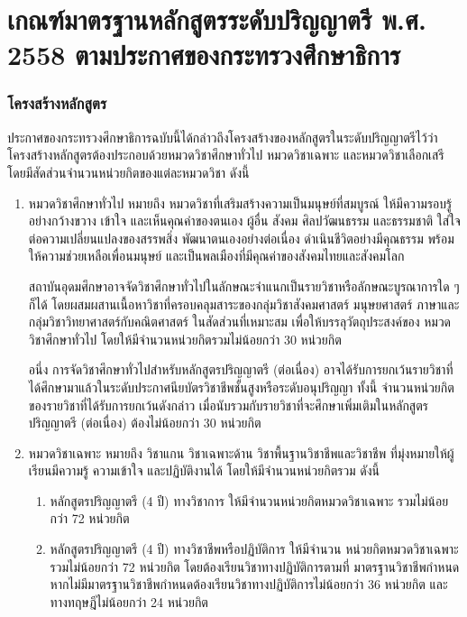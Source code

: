 \section{เกณฑ์มาตรฐานหลักสูตรระดับปริญญาตรี พ.ศ. 2558 ตามประกาศของกระทรวงศึกษาธิการ}

\subsubsection{โครงสร้างหลักสูตร}

ประกาศของกระทรวงศึกษาธิการฉบับนี้ได้กล่าวถึงโครงสร้างของหลักสูตรในระดับปริญญาตรีไว้ว่า โครงสร้างหลักสูตรต้องประกอบด้วยหมวดวิชาศึกษาทั่วไป หมวดวิชาเฉพาะ และหมวดวิชาเลือกเสรี โดยมีสัดส่วนจํานวนหน่วยกิตของแต่ละหมวดวิชา ดังนี้
\begin{enumerate}
    \item หมวดวิชาศึกษาทั่วไป หมายถึง หมวดวิชาที่เสริมสร้างความเป็นมนุษย์ที่สมบูรณ์ ให้มีความรอบรู้อย่างกว้างขวาง เข้าใจ และเห็นคุณค่าของตนเอง ผู้อื่น สังคม ศิลปวัฒนธรรม และธรรมชาติ ใส่ใจต่อความเปลี่ยนแปลงของสรรพสิ่ง พัฒนาตนเองอย่างต่อเนื่อง ดําเนินชีวิตอย่างมีคุณธรรม พร้อมให้ความช่วยเหลือเพื่อนมนุษย์ และเป็นพลเมืองที่มีคุณค่าของสังคมไทยและสังคมโลก 
    
    สถาบันอุดมศึกษาอาจจัดวิชาศึกษาทั่วไปในลักษณะจําแนกเป็นรายวิชาหรือลักษณะบูรณาการใด ๆ ก็ได้ โดยผสมผสานเนื้อหาวิชาที่ครอบคลุมสาระของกลุ่มวิชาสังคมศาสตร์ มนุษยศาสตร์ ภาษาและกลุ่มวิชาวิทยาศาสตร์กับคณิตศาสตร์ ในสัดส่วนที่เหมาะสม เพื่อให้บรรลุวัตถุประสงค์ของ หมวดวิชาศึกษาทั่วไป โดยให้มีจํานวนหน่วยกิตรวมไม่น้อยกว่า 30 หน่วยกิต

    อนึ่ง การจัดวิชาศึกษาทั่วไปสําหรับหลักสูตรปริญญาตรี (ต่อเนื่อง) อาจได้รับการยกเว้นรายวิชาที่ได้ศึกษามาแล้วในระดับประกาศนียบัตรวิชาชีพชั้นสูงหรือระดับอนุปริญญา ทั้งนี้ จํานวนหน่วยกิตของรายวิชาที่ได้รับการยกเว้นดังกล่าว เมื่อนับรวมกับรายวิชาที่จะศึกษาเพิ่มเติมในหลักสูตรปริญญาตรี (ต่อเนื่อง) ต้องไม่น้อยกว่า 30 หน่วยกิต

    \item หมวดวิชาเฉพาะ หมายถึง วิชาแกน วิชาเฉพาะด้าน วิชาพื้นฐานวิชาชีพและวิชาชีพ ที่มุ่งหมายให้ผู้เรียนมีความรู้ ความเข้าใจ และปฏิบัติงานได้ โดยให้มีจํานวนหน่วยกิตรวม ดังนี้

    \begin{enumerate}
    \item หลักสูตรปริญญาตรี (4 ปี) ทางวิชาการ ให้มีจํานวนหน่วยกิตหมวดวิชาเฉพาะ รวมไม่น้อยกว่า 72 หน่วยกิต
    \item หลักสูตรปริญญาตรี (4 ปี) ทางวิชาชีพหรือปฏิบัติการ ให้มีจํานวน หน่วยกิตหมวดวิชาเฉพาะรวมไม่น้อยกว่า 72 หน่วยกิต โดยต้องเรียนวิชาทางปฏิบัติการตามที่ มาตรฐานวิชาชีพกําหนด หากไม่มีมาตรฐานวิชาชีพกําหนดต้องเรียนวิชาทางปฏิบัติการไม่น้อยกว่า 36 หน่วยกิต และทางทฤษฎีไม่น้อยกว่า 24 หน่วยกิต


\end{enumerate}
\end{enumerate}
